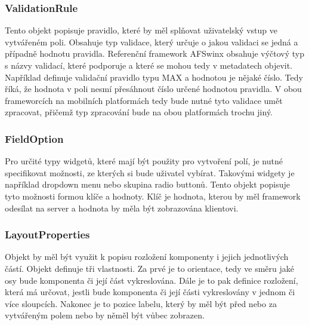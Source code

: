 \subsubsection{ValidationRule}
Tento objekt popisuje pravidlo, které by měl splňovat uživatelský vstup ve vytvářeném poli. Obsahuje typ validace, který určuje o jakou validaci se jedná a případně hodnotu pravidla. Referenční framework AFSwinx obsahuje výčtový typ s názvy validací, které podporuje a které se mohou tedy v metadatech objevit. Například definuje validační pravidlo typu MAX a hodnotou je nějaké číslo. Tedy říká, že hodnota v poli nesmí přesáhnout číslo určené hodnotou pravidla. V obou frameworcích na mobilních platformách tedy bude nutné tyto validace umět zpracovat, přičemž typ zpracování bude na obou platformách trochu jiný. 

\subsubsection{FieldOption}
Pro určité typy widgetů, které mají být použity pro vytvoření polí, je nutné specifikovat možnosti, ze kterých si bude uživatel vybírat. Takovými widgety je například dropdown menu nebo skupina radio buttonů. Tento objekt popisuje tyto možnosti formou klíče a hodnoty. Klíč je hodnota, kterou by měl framework odesílat na server a hodnota by měla být zobrazována klientovi.

\subsubsection{LayoutProperties}
Objekt by měl být využit k popisu rozložení komponenty i jejich jednotlivých částí. Objekt definuje tři vlastnosti. Za prvé je to orientace, tedy ve směru jaké osy bude komponenta či její část vykreslována. Dále je to pak definice rozložení, která má určovat, jestli bude komponenta či její části vykreslovány v jednom či více sloupcích. Nakonec je to pozice labelu, který by měl být před nebo za vytvářeným polem nebo by něměl být vůbec zobrazen.


